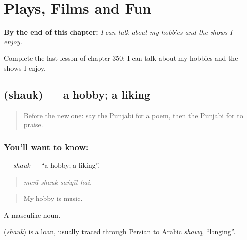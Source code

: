 
\chapter{Plays, Films and Fun}
\label{ch:pa-a2-plays-films-and-fun}

\begin{chapteropening}
\textbf{By the end of this chapter:} \emph{I can talk about my hobbies and the shows I enjoy.}

Complete the last lesson of chapter 350: I can talk about my hobbies and the shows I enjoy.
\end{chapteropening}

\section[\texorpdfstring{\pa{ਸ਼ੌਕ} (shauk)}{ਸ਼ੌਕ (shauk)}]{ (shauk) — a hobby; a liking}

\label{lesson:PA-C350-shauk}



\begin{quote}
Before the new one: say the Punjabi for a poem, then the Punjabi for to praise.
\end{quote}

\subsection*{You'll want to know: }
\textbf{} — \emph{shauk} — \textquotedblleft{}a hobby; a liking\textquotedblright{}.

\begin{quote}
   
\end{quote}

\begin{quote}
\emph{merā shauk saṅgīt hai.}
\end{quote}

\begin{quote}
My hobby is music.
\end{quote}

A masculine noun.

\begin{cousinweb}
\textbf{} (\emph{shauk}) is a loan, usually traced through Persian to Arabic \emph{shawq}, \textquotedblleft{}longing\textquotedblright{}.
\end{cousinweb}

